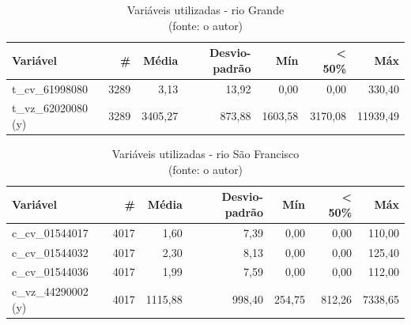 \begin{table}[!h]
	\centering \small
	\caption{Variáveis utilizadas - rio Grande \\(fonte: o autor)}
	\begin{tabular}{|l|r|r|r|r|r|r|} \hline 
		\textbf{Variável}   & \textbf{\#} & \textbf{Média} & \textbf{Desvio-padrão} & \textbf{Mín} & \textbf{< 50\%} & \textbf{Máx} \\\hline
		t\_cv\_61998080     & 3289        & 3,13           & 13,92                  & 0,00         & 0,00            & 330,40       \\\hline
		t\_vz\_62020080 (y) & 3289        & 3405,27        & 873,88                 & 1603,58      & 3170,08         & 11939,49     \\\hline
	\end{tabular}
	\label{tab:variaveis_rio_grande}
\end{table}

\begin{table}[!h]
	\centering \small
	\caption{Variáveis utilizadas - rio São Francisco \\(fonte: o autor)}
	\begin{tabular}{|l|r|r|r|r|r|r|} \hline 
		\textbf{Variável}   & \textbf{\#} & \textbf{Média} & \textbf{Desvio-padrão} & \textbf{Mín} & \textbf{< 50\%} & \textbf{Máx} \\\hline
		c\_cv\_01544017     & 4017        & 1,60           & 7,39                   & 0,00         & 0,00            & 110,00       \\\hline
		c\_cv\_01544032     & 4017        & 2,30           & 8,13                   & 0,00         & 0,00            & 125,40       \\\hline
		c\_cv\_01544036     & 4017        & 1,99           & 7,59                   & 0,00         & 0,00            & 112,00       \\\hline
		c\_vz\_44290002 (y) & 4017        & 1115,88        & 998,40                 & 254,75       & 812,26          & 7338,65      \\\hline
	\end{tabular}
	\label{tab:variaveis_rio_sao_francisco}
\end{table}
\clearpage

